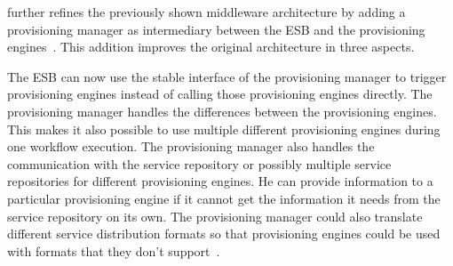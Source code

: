 \citeauthor{provisioning:dynamic} further refines the previously shown middleware architecture by adding a provisioning manager as intermediary between the ESB and the provisioning engines~\autocite{provisioning:dynamic}.
This addition improves the original architecture in three aspects.

The ESB can now use the stable interface of the provisioning manager to trigger provisioning engines instead of calling those provisioning engines directly.
The provisioning manager handles the differences between the provisioning engines.
This makes it also possible to use multiple different provisioning engines during one workflow execution.
The provisioning manager also handles the communication with the service repository or possibly multiple service repositories for different provisioning engines.
He can provide information to a particular provisioning engine if it cannot get the information it needs from the service repository on its own.
The provisioning manager could also translate different service distribution formats so that provisioning engines could be used with formats that they don't support~\autocite{provisioning:dynamic}.
